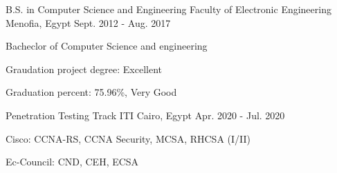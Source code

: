 

\begin{cventries}

  \cventry
    {B.S. in Computer Science and Engineering} %
    {Faculty of Electronic Engineering} %
    {Menofia, Egypt} %
    {Sept. 2012 - Aug. 2017} %
    {
      \begin{cvitems} %
        \item {Bacheclor of Computer Science and engineering}
        \item {Graudation project degree: Excellent}
        \item {Graduation percent: 75.96\%, Very Good }
      \end{cvitems}
    }
  \cventry
    {Penetration Testing Track} %
    {ITI} %
    {Cairo, Egypt} %
    {Apr. 2020 - Jul. 2020} %
    {
      \begin{cvitems} %
        \item {Cisco: CCNA-RS, CCNA Security, MCSA, RHCSA (I/II)}
        \item {Ec-Council: CND, CEH, ECSA}
      \end{cvitems}
    }
\end{cventries}
